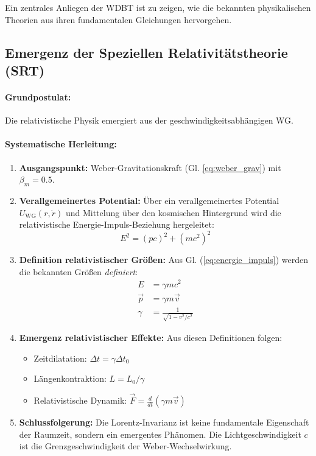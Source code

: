 \documentclass[11pt, a4paper]{article}
\begin{document}
Ein zentrales Anliegen der WDBT ist zu zeigen, wie die bekannten physikalischen Theorien aus ihren fundamentalen Gleichungen hervorgehen.

\subsection{Emergenz der Speziellen Relativitätstheorie (SRT)}
\label{subsec:emergenz_srt}

\paragraph{Grundpostulat:} Die relativistische Physik emergiert aus der geschwindigkeitsabhängigen WG.

\paragraph{Systematische Herleitung:}
\begin{enumerate}
    \item \textbf{Ausgangspunkt:} Weber-Gravitationskraft (Gl. \ref{eq:weber_grav}) mit $\beta_m = 0.5$.
    \item \textbf{Verallgemeinertes Potential:} Über ein verallgemeinertes Potential $U_{\text{WG}}(r, \dot{r})$ und Mittelung über den kosmischen Hintergrund wird die relativistische Energie-Impuls-Beziehung hergeleitet:
    \begin{equation}
    \label{eq:energie_impuls}
    E^2 = (p c)^2 + (m c^2)^2
    \end{equation}
    \item \textbf{Definition relativistischer Größen:} Aus Gl. (\ref{eq:energie_impuls}) werden die bekannten Größen \textit{definiert}:
    \begin{align}
    E &= \gamma m c^2 \\
    \vec{p} &= \gamma m \vec{v} \\
    \gamma &= \frac{1}{\sqrt{1 - v^2/c^2}}
    \end{align}
    \item \textbf{Emergenz relativistischer Effekte:} Aus diesen Definitionen folgen:
    \begin{itemize}
        \item Zeitdilatation: $\Delta t = \gamma \Delta t_0$
        \item Längenkontraktion: $L = L_0 / \gamma$
        \item Relativistische Dynamik: $\vec{F} = \frac{d}{dt}(\gamma m \vec{v})$
    \end{itemize}
    \item \textbf{Schlussfolgerung:} Die Lorentz-Invarianz ist keine fundamentale Eigenschaft der Raumzeit, sondern ein emergentes Phänomen. Die Lichtgeschwindigkeit $c$ ist die Grenzgeschwindigkeit der Weber-Wechselwirkung.
\end{enumerate}
\end{document}
